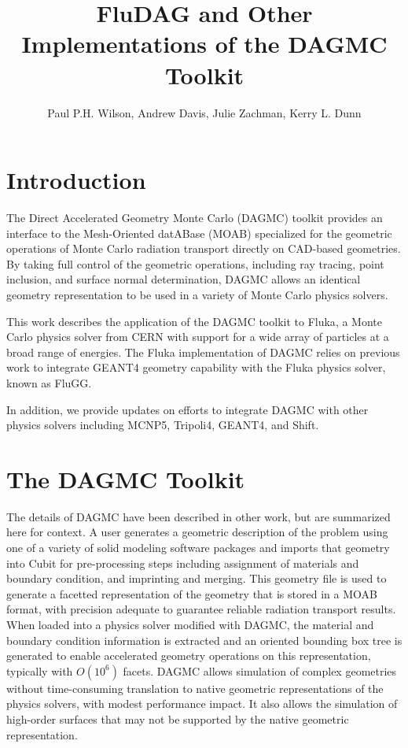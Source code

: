 \documentclass{anstrans}[11pt]
\title{FluDAG and Other Implementations of the DAGMC Toolkit}
\author{Paul P.H. Wilson, Andrew Davis, Julie Zachman, Kerry L. Dunn}
\institute{University of Wisconsin-Madison, 1500 Engineering Dr,
  Madison, WI 53706}
\begin{document}
\section{Introduction}

The Direct Accelerated Geometry Monte Carlo (DAGMC)\cite{dagmc} toolkit provides
an interface to the Mesh-Oriented datABase (MOAB)\cite{MOAB} specialized for the
geometric operations of Monte Carlo radiation transport directly on
CAD-based geometries.  By taking full control of the geometric
operations, including ray tracing, point inclusion, and surface
normal determination, DAGMC allows an identical geometry representation to be
used in a variety of Monte Carlo physics solvers.

This work describes the application of the DAGMC toolkit to
Fluka\cite{fluka}, a Monte Carlo physics solver from CERN with support
for a wide array of particles at a broad range of energies.  The Fluka
implementation of DAGMC relies on previous work to integrate
GEANT4\cite{GEANT4} geometry capability with the Fluka physics solver,
known as FluGG\cite{flugg}.

In addition, we provide updates on efforts to integrate DAGMC with
other physics solvers including MCNP5\cite{mcnp5},
Tripoli4\cite{tripoli}, GEANT4, and Shift\cite{shift}.

\section{The DAGMC Toolkit}

The details of DAGMC have been described in other work\cite{dagmc}, but are
summarized here for context.  A user generates a geometric description
of the problem using one of a variety of solid modeling software
packages and imports that geometry into Cubit\cite{cubit} for
pre-processing steps including assignment of materials and boundary
condition, and imprinting and merging.  This geometry file is used to
generate a facetted representation of the geometry that is stored in a
MOAB format, with precision adequate to guarantee reliable radiation
transport results\cite{snouffer_ans}.  When loaded into a physics solver
modified with DAGMC, the material and boundary condition information
is extracted and an oriented bounding box tree is generated to enable
accelerated geometry operations on this representation, typically with $O(10^6)$
facets.  DAGMC allows simulation of complex geometries without
time-consuming translation to native geometric representations of the
physics solvers, with modest performance impact.  It also allows the
simulation of high-order surfaces that may not be supported by the
native geometric representation.
\end{document}
